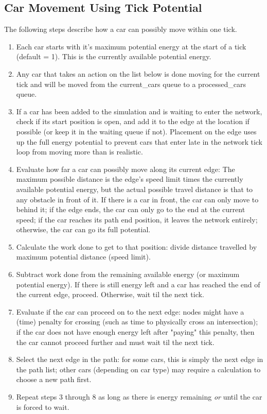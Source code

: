 \subsection{Car Movement Using Tick Potential}
\par The following steps describe how a car can possibly move within one tick.
\begin{enumerate}
    \item Each car starts with it's maximum potential energy at the start of a tick (default = 1).  This is the currently available potential energy.
    \item Any car that takes an action on the list below is done moving for the current tick and will be moved from the current\_cars queue to a processed\_cars queue.
    \item If a car has been added to the simulation and is waiting to enter the network, check if its start position is open, and add it to the edge at the location if possible (or keep it in the waiting queue if not).  Placement on the edge uses up the full energy potential to prevent cars that enter late in the network tick loop from moving more than is realistic.
    \item Evaluate how far a car can possibly move along its current edge:  The maximum possible distance is the edge's speed limit times the currently available potential energy, but the actual possible travel distance is that to any obstacle in front of it.  If there is a car in front, the car can only move to behind it; if the edge ends, the car can only go to the end at the current speed; if the car reaches its path end position, it leaves the network entirely; otherwise, the car can go its full potential.  
    \item Calculate the work done to get to that position:  divide distance travelled by maximum potential distance (speed limit).
    \item Subtract work done from the remaining available energy (or maximum potential energy).  If there is still energy left and a car has reached the end of the current edge, proceed.  Otherwise, wait til the next tick.
    \item Evaluate if the car can proceed on to the next edge:  nodes might have a (time) penalty for crossing (such as time to physically cross an intersection); if the car does not have enough energy left after "paying" this penalty, then the car cannot proceed further and must wait til the next tick.
    \item Select the next edge in the path:  for some cars, this is simply the next edge in the path list; other cars (depending on car type) may require a calculation to choose a new path first.
    \item Repeat steps 3 through 8 as long as there is energy remaining \textit{or} until the car is forced to wait.
\end{enumerate}


